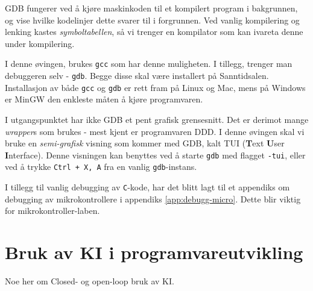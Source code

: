 \begin{alphasection}
GDB fungerer ved å kjøre maskinkoden til et kompilert program i bakgrunnen, og vise hvilke kodelinjer dette svarer til i forgrunnen. Ved vanlig kompilering og lenking kastes \textit{symboltabellen}, så vi trenger en kompilator som kan ivareta denne under kompilering.

I denne øvingen, brukes \verb|gcc| som har denne muligheten. I tillegg, trenger man debuggeren selv - \verb|gdb|. Begge disse skal være installert på Sanntidsalen. Installasjon av både \verb|gcc| og \verb|gdb| er rett fram på Linux og Mac, mens på Windows er MinGW den enkleste måten å kjøre programvaren.

I utgangspunktet har ikke GDB et pent grafisk grensesnitt. Det er derimot mange \textit{wrapper}s som brukes - mest kjent er programvaren DDD. I denne øvingen skal vi bruke en \textit{semi-grafisk} visning som kommer med GDB, kalt TUI (\textbf{T}ext \textbf{U}ser \textbf{I}nterface). Denne visningen kan benyttes ved å starte \verb|gdb| med flagget \verb|-tui|, eller ved å trykke \verb|Ctrl + X, A| fra en vanlig \verb|gdb|-instans.


I tillegg til vanlig debugging av \verb|C|-kode, har det blitt lagt til et appendiks om debugging av mikrokontrollere i appendiks \ref{app:debugg-micro}. Dette blir viktig for mikrokontroller-laben.



\section{Bruk av KI i programvareutvikling}

Noe her om Closed- og open-loop bruk av KI.\label{sec:3-bruk-av-KI}

\end{alphasection}

\setcounter{section}{0}
